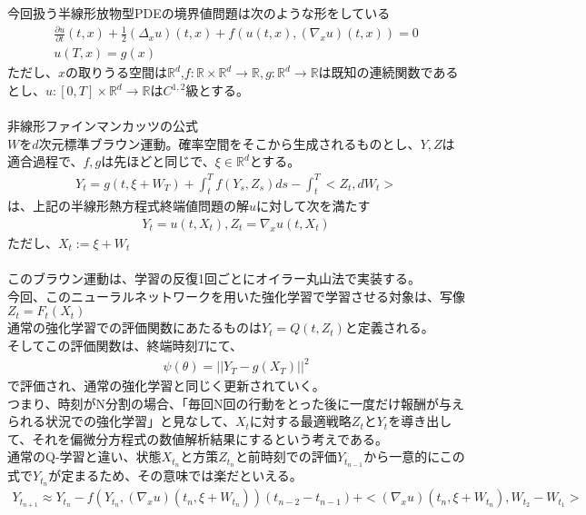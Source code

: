 \documentclass{jsarticle}
\begin{document}
今回扱う半線形放物型PDEの境界値問題は次のような形をしている\\
\begin{eqnarray}
\frac{\partial u}{\partial t}(t,x)+\frac{1}{2}(\Delta_xu)(t,x)+f(u(t,x),(\nabla_xu)(t,x))=0\\
u(T,x)=g(x)
\end{eqnarray}
ただし、$x$の取りうる空間は$\mathbb{R}^d$,$f:\mathbb{R}\times\mathbb{R}^d\rightarrow \mathbb{R},g:\mathbb{R}^d\rightarrow\mathbb{R}$は既知の連続関数であるとし、$u:[0,T]\times\mathbb{R}^d\rightarrow \mathbb{R}$は$C^{1,2}$級とする。\\
　\\
非線形ファインマンカッツの公式\\
$W$を$d$次元標準ブラウン運動。確率空間をそこから生成されるものとし、$Y,Z$は適合過程で、$f,g$は先ほどと同じで、$\xi\in\mathbb{R}^d$とする。
\begin{eqnarray}
Y_t=g(t,\xi+W_T)+\int^T_tf(Y_s,Z_s)ds-\int^T_t<Z_t,dW_t>
\end{eqnarray}
は、上記の半線形熱方程式終端値問題の解$u$に対して次を満たす
\begin{eqnarray}
Y_t=u(t,X_t),Z_t=\nabla_xu(t,X_t)
\end{eqnarray}
ただし、$X_t:=\xi+W_t$\\
　\\
このブラウン運動は、学習の反復1回ごとにオイラー丸山法で実装する。\\
今回、このニューラルネットワークを用いた強化学習で学習させる対象は、写像$Z_t=F_t(X_t)$\\
通常の強化学習での評価関数にあたるものは$Y_t=Q(t,Z_t)$と定義される。\\
そしてこの評価関数は、終端時刻$T$にて、
\begin{eqnarray}
\psi(\theta)=||Y_T-g(X_T)||^2
\end{eqnarray}
 で評価され、通常の強化学習と同じく更新されていく。\\
つまり、時刻がN分割の場合、「毎回N回の行動をとった後に一度だけ報酬が与えられる状況での強化学習」と見なして、$X_t$に対する最適戦略$Z_t$と$Y_t$を導き出して、それを偏微分方程式の数値解析結果にするという考えである。\\
通常のQ-学習と違い、状態$X_{t_n}$と方策$Z_{t_n}$と前時刻での評価$Y_{t_{n-1}}$から一意的にこの式で$Y_{t_n}$が定まるため、その意味では楽だといえる。\\
\begin{eqnarray}
Y_{t_{n+1}}\approx Y_{t_n}-f(Y_{t_n},(\nabla_xu)(t_n,\xi+W_{t_n}))(t_{n-2}-t_{n-1})+<(\nabla_xu)(t_n,\xi+W_{t_n}),W_{t_2}-W_{t_1}>
\end{eqnarray}
\end{document}
